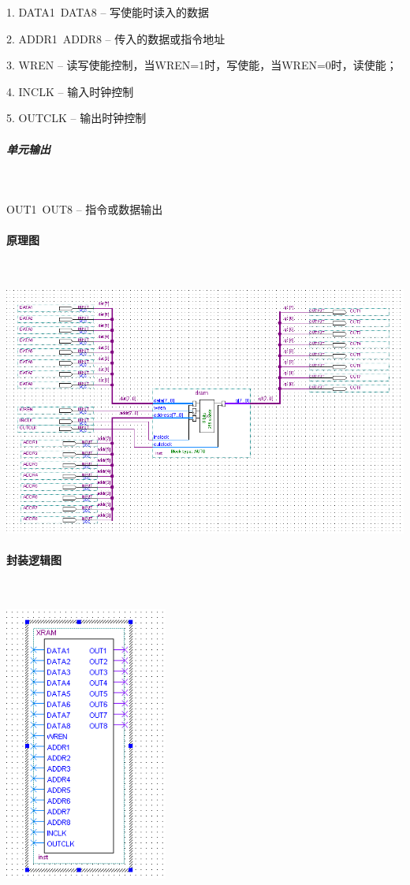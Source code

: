 \documentclass[UTF8]{ctexart}
\begin{document}
    1. DATA1~DATA8 -- 写使能时读入的数据

    2. ADDR1~ADDR8 -- 传入的数据或指令地址

    3. WREN -- 读写使能控制，当WREN=1时，写使能，当WREN=0时，读使能；

    4. INCLK -- 输入时钟控制

    5. OUTCLK -- 输出时钟控制

    \subparagraph{单元输出}

    ~

    OUT1~OUT8 -- 指令或数据输出

    \paragraph{原理图}

    ~

    \includegraphics[width=1.0\textwidth]{img/RAM原理图.png}

    \paragraph{封装逻辑图}

    ~
    
    \includegraphics[width=0.4\textwidth]{img/RAM封装逻辑图.png}
\end{document}
